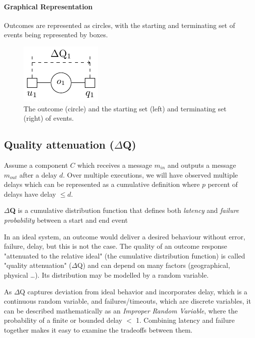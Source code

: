     \paragraph{Graphical Representation}
    Outcomes are represented as circles, with the starting and terminating set of events being represented by boxes.
    \begin{figure}[H]
        \begin{center}
            \includegraphics[scale=1.2]{tikz/outdq.pdf}
        \end{center}
        \caption{The outcome (circle) and the starting set (left) and terminating set (right) of events.}
    \end{figure}

\subsection{Quality attenuation ($\Delta$Q)}
        Assume a component $C$ which receives a message $m_{in}$ and outputs a message $m_{out}$ after a delay $d$. Over multiple executions, we will have observed multiple delays which can be represented as a cumulative definition where $p$ percent of delays have delay $\le d$. \cite{art} 

        \textbf{$\Delta$Q} is a cumulative distribution function that defines both \textit{latency} and \textit{failure probability} between a start and end event \cite{dq-tut}

        In an ideal system, an outcome would deliver a desired behaviour without error, failure, delay, but this is not the case. The quality of an outcome response "attenuated to the relative ideal" (the cumulative distribution function) is called "quality attenuation" ($\Delta$Q) and can depend on many factors (geographical, physical \dots). Its distribution may be modelled by a random variable.

    As $\Delta$Q captures deviation from ideal behavior and incorporates delay, which is a continuous random variable, and failures/timeouts, which are discrete variables, it can be described mathematically as an \textit{Improper Random Variable}, where the probability of a finite or bounded delay $<$ 1. Combining latency and failure together makes it easy to examine the tradeoffs between them.

